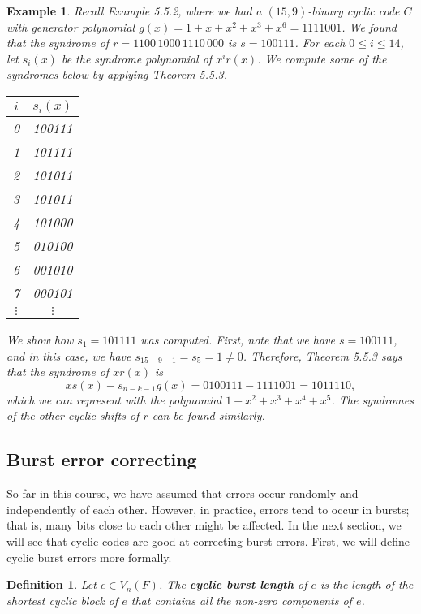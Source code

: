 \documentclass[10pt]{article}
\theoremstyle{newstyle}
\newtheorem{defn}[thm]{Definition}
\newtheorem{exmp}[thm]{Example}
\begin{document}
\begin{exmp}
Recall Example 5.5.2, where we had a $(15, 9)$-binary cyclic code $C$ with generator polynomial 
$g(x) = 1+x+x^2+x^3+x^6 = 1111001$. We found that the syndrome of 
$r = 1100\,1000\,1110\,000$ is $s = 100111$. For each $0 \leq i \leq 14$, let 
$s_i(x)$ be the syndrome polynomial of $x^i r(x)$. We compute some of the syndromes below 
by applying Theorem 5.5.3. 
\begin{table}[h]
\centering
\begin{tabular}{c|c}
$i$      & $s_i(x)$ \\ \hline
0        & 100111   \\
1        & 101111   \\
2        & 101011   \\
3        & 101011   \\
4        & 101000   \\
5        & 010100   \\
6        & 001010   \\
7        & 000101   \\
$\vdots$ & $\vdots$
\end{tabular}
\end{table}

We show how $s_1 = 101111$ was computed. 
First, note that we have $s = 100111$, and in this case, we have $s_{15-9-1} = s_5 = 1 \neq 0$. 
Therefore, Theorem 5.5.3 says that the syndrome of $xr(x)$ is 
\[ xs(x) - s_{n-k-1}g(x) = 0100111 - 1111001 = 1011110, \]
which we can represent with the polynomial $1 + x^2 + x^3 + x^4 + x^5$. The syndromes of the other 
cyclic shifts of $r$ can be found similarly. 
\end{exmp}

\subsection{Burst error correcting}

So far in this course, we have assumed that errors occur randomly and independently of each other. 
However, in practice, errors tend to occur in bursts; that is, many bits close to each other 
might be affected. In the next section, we will see that cyclic codes are good at correcting 
burst errors. First, we will define cyclic burst errors more formally. 

\begin{defn}
Let $e \in V_n(F)$. The {\bf cyclic burst length} of $e$ is the length of the shortest 
cyclic block of $e$ that contains all the non-zero components of $e$. 
\end{defn}
\end{document}
